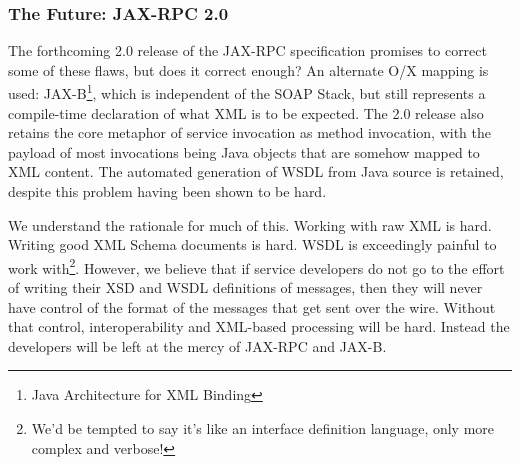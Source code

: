 \subsubsection{The Future: JAX-RPC 2.0}

The forthcoming 2.0 release of the JAX-RPC specification promises to
correct some of these flaws, but does it correct enough? An alternate
O/X mapping is used: JAX-B\footnote{Java Architecture for XML
Binding}, which is independent of the SOAP Stack, but still represents
a compile-time declaration of what XML is to be expected. The 2.0
release also retains the core metaphor of service invocation as method
invocation, with the payload of most invocations being Java objects
that are somehow mapped to XML content. The automated generation of
WSDL from Java source is retained, despite this problem having been
shown to be hard.

We understand the rationale for much of this. Working with raw XML is
hard.  Writing good XML Schema documents is hard. WSDL is exceedingly
painful to work with\footnote{We'd be tempted to say it's like an
interface definition language, only more complex and
verbose!}. However, we believe that if service developers do not go to
the effort of writing their XSD and WSDL definitions of messages, then
they will never have control of the format of the messages that get
sent over the wire. Without that control, interoperability and
XML-based processing will be hard. Instead the developers will be left
at the mercy of JAX-RPC and JAX-B.

%


